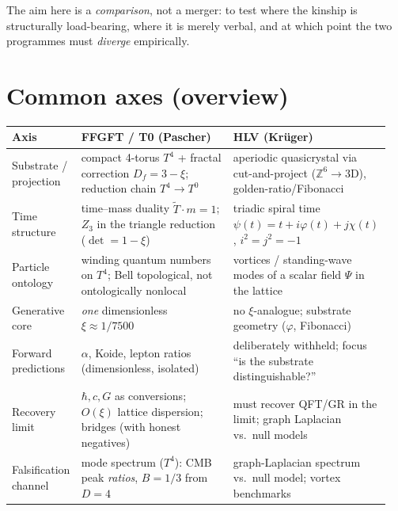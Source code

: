 The aim here is a \emph{comparison}, not a merger: to test where the kinship is structurally
load-bearing, where it is merely verbal, and at which point the two programmes must \emph{diverge}
empirically.

\section{Common axes (overview)}

\begin{center}
\small
\begin{tabular}{@{}p{0.15\linewidth}p{0.40\linewidth}p{0.40\linewidth}@{}}
\hline
\textbf{Axis} & \textbf{FFGFT / T0 (Pascher)} & \textbf{HLV (Krüger)}\\
\hline
Substrate / projection
& compact 4-torus $T^4$ + fractal correction $D_f=3-\xi$; reduction chain $T^4\!\to\!T^0$
& aperiodic quasicrystal via cut-and-project ($\mathbb{Z}^6\!\to\!3$D), golden-ratio/Fibonacci\\
Time structure
& time--mass duality $\tilde T\cdot m=1$; $Z_3$ in the triangle reduction ($\det=1-\xi$)
& triadic spiral time $\psi(t)=t+i\varphi(t)+j\chi(t)$, $i^2=j^2=-1$\\
Particle ontology
& winding quantum numbers on $T^4$; Bell topological, not ontologically nonlocal
& vortices / standing-wave modes of a scalar field $\Psi$ in the lattice\\
Generative core
& \emph{one} dimensionless $\xi\approx 1/7500$
& no $\xi$-analogue; substrate geometry ($\varphi$, Fibonacci)\\
Forward predictions
& $\alpha$, Koide, lepton ratios (dimensionless, isolated)
& deliberately withheld; focus \enquote{is the substrate distinguishable?}\\
Recovery limit
& $\hbar,c,G$ as conversions; $O(\xi)$ lattice dispersion; bridges (with honest negatives)
& must recover QFT/GR in the limit; graph Laplacian vs.\ null models\\
Falsification channel
& mode spectrum ($T^4$): CMB peak \emph{ratios}, $B=1/3$ from $D=4$
& graph-Laplacian spectrum vs.\ null model; vortex benchmarks\\
\hline
\end{tabular}
\end{center}

